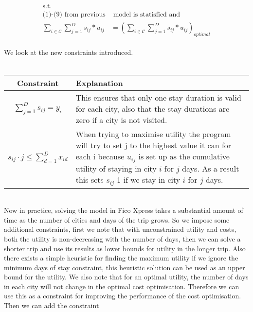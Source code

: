 \documentclass[12pt]{article}
\begin{document}
\begin{align*}
\text{s.t.~~~~~~~~} & \\
\text{(1)-(9) from previous} &\text{ model is statisfied and} \\
\sum_{i \in \mathcal{C}} \sum_{j=1}^{D} s_{ij} * u_{ij} &= (\sum_{i \in \mathcal{C}} \sum_{j=1}^{D} s_{ij} * u_{ij})_{optimal}
\end{align*}\\
We look at the new constraints introduced.\\
\vspace{5mm}\\
\begin{tabular}{c|p{11cm}}
\hline
Constraint &  Explanation \\
\hline
$\sum_{j=1}^{D} s_{ij} = y_{i}$ & This ensures that only one stay duration is valid for each city, also that the stay durations are zero if a city is not visited. \\
\hline
$s_{ij} \cdot j \leq \sum_{d=1}^{D} x_{id}$ & When trying to maximise utility the program will try to set j to the highest value it can for each i because $u_{ij}$ is set up as the cumulative utility of staying in city $i$ for $j$ days. As a result this sets $s_{ij}$ 1 if we stay in city $i$ for $j$ days. \\
\end{tabular}
\vspace{5mm}\\
Now in practice, solving the model in Fico Xpress takes a substantial amount of time as the number of cities and days of the trip grows. So we impose some additional constraints, first we note that with unconstrained utility and costs, both the utility is non-decreasing with the number of days, then we can solve a shorter trip and use its results as lower bounds for utility in the longer trip. Also there exists a simple heuristic for finding the maximum utility if we ignore the minimum days of stay constraint, this heuristic solution can be used as an upper bound for the utility. We also note that for an optimal utility, the number of days in each city will not change in the optimal cost optimisation. Therefore we can use this as a constraint for improving the performance of the cost optimisation. Then we can add the constraint
\end{document}
